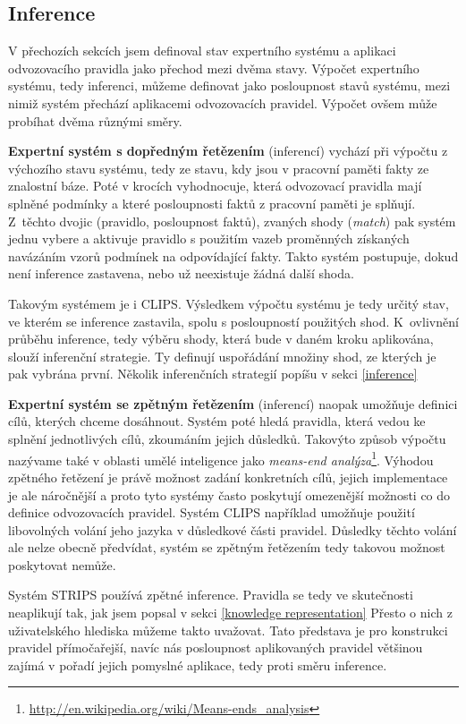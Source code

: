 \subsection{Inference}

V přechozích sekcích jsem definoval stav expertního systému a aplikaci
odvozovacího pravidla jako přechod mezi dvěma stavy. Výpočet expertního systému,
tedy inferenci, můžeme definovat jako posloupnost stavů systému, mezi nimiž
systém přechází aplikacemi odvozovacích pravidel. Výpočet ovšem může probíhat
dvěma různými směry.

\textbf{Expertní systém s dopředným řetězením} (inferencí) vychází při výpočtu z
výchozího stavu systému, tedy ze stavu, kdy jsou v pracovní paměti fakty ze
znalostní báze. Poté v krocích vyhodnocuje, která odvozovací pravidla mají
splněné podmínky a které posloupnosti faktů z pracovní paměti je splňují.
Z~těchto dvojic (pravidlo, posloupnost faktů), zvaných shody (\emph{match}) pak
systém jednu vybere a aktivuje pravidlo s použitím vazeb proměnných získaných
navázáním vzorů podmínek na odpovídající fakty. Takto systém postupuje, dokud není
inference zastavena, nebo už neexistuje žádná další shoda.

Takovým systémem je i CLIPS. Výsledkem výpočtu systému je tedy určitý stav, ve
kterém se inference zastavila, spolu s posloupností použitých shod. K~ovlivnění
průběhu inference, tedy výběru shody, která bude v daném kroku aplikována,
slouží inferenční strategie. Ty definují uspořádání množiny shod, ze kterých je
pak vybrána první. Několik inferenčních strategií popíšu v sekci \ref{inference}

\textbf{Expertní systém se zpětným řetězením} (inferencí) naopak umožňuje
definici cílů, kterých chceme dosáhnout. Systém poté hledá pravidla, která
vedou ke splnění jednotlivých cílů, zkoumáním jejich důsledků. Takovýto způsob
výpočtu nazývame také v oblasti umělé inteligence jako \emph{means-end
analýza}\footnote{\url{http://en.wikipedia.org/wiki/Means-ends\_analysis}}.
Výhodou zpětného řetězení je právě možnost zadání konkretních cílů, jejich
implementace je ale náročnější a proto tyto systémy často poskytují omezenější
možnosti co do definice odvozovacích pravidel. Systém CLIPS například umožňuje
použití libovolných volání jeho jazyka v důsledkové části pravidel. Důsledky
těchto volání ale nelze obecně předvídat, systém se zpětným řetězením tedy
takovou možnost poskytovat nemůže.

Systém STRIPS používá zpětné inference. Pravidla se tedy ve skutečnosti
neaplikují tak, jak jsem popsal v sekci \ref{knowledge representation} Přesto o
nich z uživatelského hlediska můžeme takto uvažovat. Tato představa je pro
konstrukci pravidel přímočařejší, navíc nás posloupnost aplikovaných pravidel
většinou zajímá v pořadí jejich pomyslné aplikace, tedy proti směru inference.

